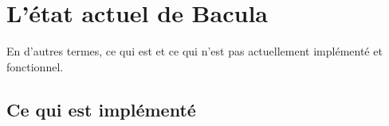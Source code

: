 
\chapter{L'\'etat actuel de Bacula}
\label{_ChapterStart2}

En d'autres termes, ce qui est et ce qui n'est pas actuellement impl\'ement\'e
et fonctionnel. 

\section{Ce qui est impl\'ement\'e}

